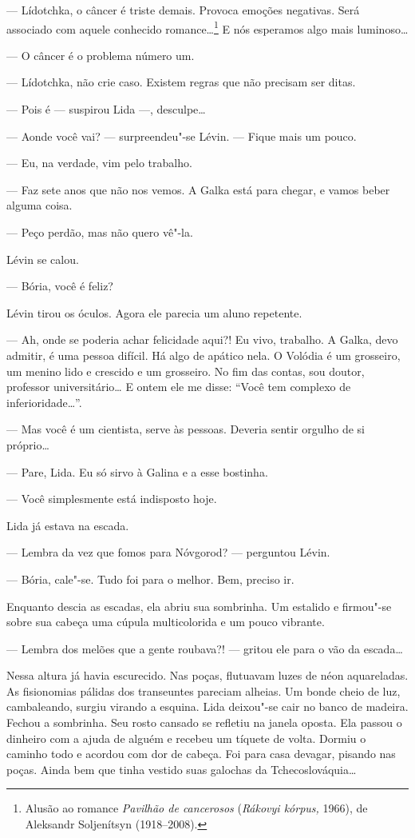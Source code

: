 --- Lídotchka, o câncer é triste demais. Provoca emoções negativas. Será
associado com aquele conhecido romance\ldots{}\footnote{Alusão ao romance
  \emph{Pavilhão de cancerosos} (\emph{Rákovyi kórpus,} 1966), de
  Aleksandr Soljenítsyn (1918--2008).} E nós esperamos algo mais
luminoso\ldots{}

--- O câncer é o problema número um.

--- Lídotchka, não crie caso. Existem regras que não precisam ser ditas.

--- Pois é --- suspirou Lida ---, desculpe\ldots{}

--- Aonde você vai? --- surpreendeu"-se Lévin. --- Fique mais um pouco.

--- Eu, na verdade, vim pelo trabalho.

--- Faz sete anos que não nos vemos. A Galka está para chegar, e vamos
beber alguma coisa.

--- Peço perdão, mas não quero vê"-la.

Lévin se calou.

--- Bória, você é feliz?

Lévin tirou os óculos. Agora ele parecia um aluno repetente.

--- Ah, onde se poderia achar felicidade aqui?! Eu vivo, trabalho. A
Galka, devo admitir, é uma pessoa difícil. Há algo de apático nela. O
Volódia é um grosseiro, um menino lido e crescido e um grosseiro. No fim
das contas, sou doutor, professor universitário\ldots{} E ontem ele me disse:
``Você tem complexo de inferioridade\ldots{}''.

--- Mas você é um cientista, serve às pessoas. Deveria sentir orgulho de
si próprio\ldots{}

--- Pare, Lida. Eu só sirvo à Galina e a esse bostinha.

--- Você simplesmente está indisposto hoje.

Lida já estava na escada.

--- Lembra da vez que fomos para Nóvgorod? --- perguntou Lévin.

--- Bória, cale"-se. Tudo foi para o melhor. Bem, preciso ir.

Enquanto descia as escadas, ela abriu sua sombrinha. Um estalido e
firmou"-se sobre sua cabeça uma cúpula multicolorida e um pouco vibrante.

--- Lembra dos melões que a gente roubava?! --- gritou ele para o vão da
escada\ldots{}

Nessa altura já havia escurecido. Nas poças, flutuavam luzes de néon
aquareladas. As fisionomias pálidas dos transeuntes pareciam alheias. Um
bonde cheio de luz, cambaleando, surgiu virando a esquina. Lida
deixou"-se cair no banco de madeira. Fechou a sombrinha. Seu rosto
cansado se refletiu na janela oposta. Ela passou o dinheiro com a ajuda
de alguém e recebeu um tíquete de volta. Dormiu o caminho todo e acordou
com dor de cabeça. Foi para casa devagar, pisando nas poças. Ainda bem
que tinha vestido suas galochas da Tchecoslováquia\ldots{}

